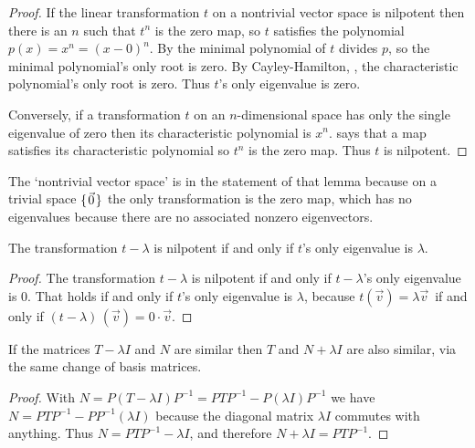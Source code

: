 \begin{proof}
If the linear transformation $t$ on a nontrivial vector space
is nilpotent then there 
is an $n$ such that $t^n$ is the zero map,
so $t$ satisfies the polynomial $p(x)=x^n=(x-0)^n$.
By  the minimal polynomial of 
$t$ divides $p$, so the minimal polynomial's only root is zero.
By Cayley-Hamilton, ,
the characteristic polynomial's only root is zero.
Thus $t$'s only eigenvalue is zero.

Conversely, if a transformation \( t \) on an
\( n \)-dimensional space has only the single eigenvalue of zero 
then its characteristic polynomial is \( x^n \). 
 says that a map satisfies its
characteristic polynomial so \( t^n \) is the zero map.
Thus $t$ is nilpotent.
\end{proof}

\noindent The `nontrivial vector space' is in the statement of 
that lemma because on a trivial
space $\mbox{$\{\hspace{0.1em}\vec{0}\hspace{0.1em}\}$}$ the only transformation is the zero map, which has
no eigenvalues because there are no associated nonzero eigenvectors.

\begin{corollary} \label{cor:tMinLambdaNilpotent}
The transformation $t-\lambda$ is nilpotent if and only if 
$t$'s only eigenvalue is $\lambda$.   
\end{corollary}

\begin{proof}
The transformation \( t-\lambda \) is nilpotent if and only if
$t-\lambda$'s only eigenvalue is \( 0 \).
That holds if and only if $t$'s only eigenvalue is $\lambda$, because
\( t(\vec{v})=\lambda\vec{v} \,\) if and 
only if \( (t-\lambda)\,(\vec{v})=0\cdot\vec{v} \).
\end{proof}

\begin{lemma}   \label{le:SimRespAddScalar}
If the matrices \( T-\lambda I \) and \( N \) are similar 
then \( T \) and \( N+\lambda I \) are also similar,
via the same change of basis matrices.
\end{lemma}

\begin{proof}
With \( N=P(T-\lambda I)P^{-1}=PTP^{-1}-P(\lambda I)P^{-1} \)
we have $N=PTP^{-1}-PP^{-1}(\lambda I)$
because the diagonal matrix \( \lambda I \) commutes with anything. 
Thus \( N=PTP^{-1}-\lambda I \),
and therefore \( N+\lambda I=PTP^{-1} \).
\end{proof}

